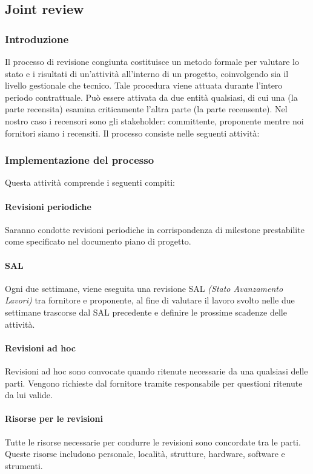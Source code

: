 \subsection{Joint review} 

\subsubsection{Introduzione}
Il processo di revisione congiunta costituisce un metodo formale per valutare lo stato e i risultati di un'attività all'interno di un progetto, coinvolgendo sia il livello gestionale che tecnico. Tale procedura viene attuata durante l'intero periodo contrattuale. Può essere attivata da due entità qualsiasi, di cui una (la parte recensita) esamina criticamente l'altra parte (la parte recensente).
Nel nostro caso i recensori sono gli stakeholder: committente, proponente mentre noi fornitori siamo i recensiti. 
Il processo consiste nelle seguenti attività: 

\subsubsection{Implementazione del processo}
Questa attività comprende i seguenti compiti: 

\paragraph{Revisioni periodiche}
Saranno condotte revisioni periodiche in corrispondenza di milestone prestabilite come specificato nel documento piano di progetto. 

\paragraph{SAL}
Ogni due settimane, viene eseguita una revisione SAL \textit{(Stato Avanzamento Lavori)} tra fornitore e proponente, al fine di valutare il lavoro svolto nelle due settimane trascorse dal SAL precedente e definire le prossime scadenze delle attività. 

\paragraph{Revisioni ad hoc}
Revisioni ad hoc sono convocate quando ritenute necessarie da una qualsiasi delle parti.
Vengono richieste dal fornitore tramite responsabile per questioni ritenute da lui valide. 

\paragraph{Risorse per le revisioni}
Tutte le risorse necessarie per condurre le revisioni sono concordate tra le parti. Queste risorse includono personale, località, strutture, hardware, software e strumenti. 

